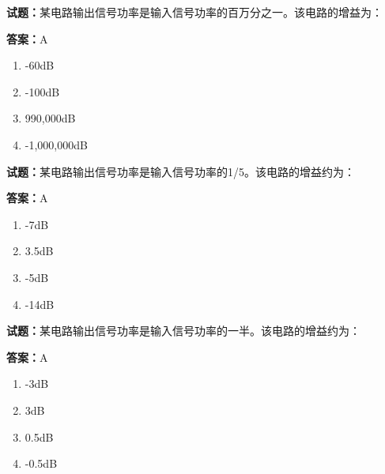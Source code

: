 \documentclass{ctexbook}
\begin{document}




\vspace{1em}

\textbf{试题：}某电路输出信号功率是输入信号功率的百万分之一。该电路的增益为： 

\textbf{答案：}A 

\begin{enumerate}[leftmargin=3em]
  \item -60dB 

  \item -100dB 

  \item 990,000dB 

  \item -1,000,000dB 

\end{enumerate}






\vspace{1em}

\textbf{试题：}某电路输出信号功率是输入信号功率的1/5。该电路的增益约为： 

\textbf{答案：}A 

\begin{enumerate}[leftmargin=3em]
  \item -7dB 

  \item 3.5dB 

  \item -5dB 

  \item -14dB 

\end{enumerate}





\vspace{1em}

\textbf{试题：}某电路输出信号功率是输入信号功率的一半。该电路的增益约为： 

\textbf{答案：}A 

\begin{enumerate}[leftmargin=3em]
  \item -3dB 

  \item 3dB 

  \item 0.5dB 

  \item -0.5dB 

\end{enumerate}
\end{document}
